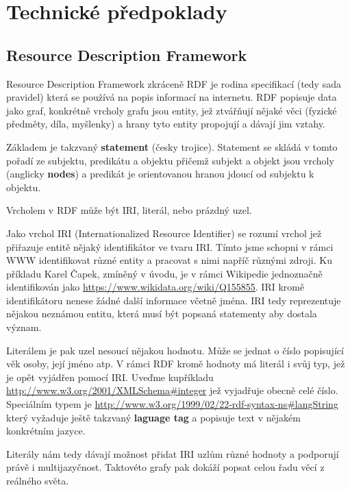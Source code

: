 \chapter{Technické předpoklady}

\section{Resource Description Framework}
Resource Description Framework zkráceně RDF je rodina specifikací (tedy sada pravidel) která se používá na popis informací na internetu. RDF popisuje data jako graf, konkrétně vrcholy grafu jsou entity, jež ztvářňují nějaké věci (fyzické předměty, díla, myšlenky) a hrany tyto entity propojují a dávají jim vztahy.

Základem je takzvaný \textbf{statement} (česky trojice). Statement se skládá v tomto pořadí ze subjektu, predikátu a objektu přičemž subjekt a objekt jsou vrcholy (anglicky \textbf{nodes}) a predikát je orientovanou hranou jdoucí od subjektu k objektu.

Vrcholem v RDF může být IRI, literál, nebo prázdný uzel.

\medskip

Jako vrchol IRI (Internationalized Resource Identifier) se rozumí vrchol jež přiřazuje entitě nějaký identifikátor ve tvaru IRI. Tímto jsme schopni v rámci WWW identifikovat různé entity a pracovat s nimi napříč různými zdroji. Ku příkladu Karel Čapek, zmíněný v úvodu, je v rámci Wikipedie jednoznačně identifikován jako \url{https://www.wikidata.org/wiki/Q155855}. IRI kromě identifikátoru nenese žádné další informace včetně jména. IRI tedy reprezentuje nějakou neznámou entitu, která musí být popsaná statementy aby dostala význam.

\medskip

Literálem je pak uzel nesoucí nějakou hodnotu. Může se jednat o číslo popisující věk osoby, její jméno atp. V rámci RDF kromě hodnoty má literál i svůj typ, jež je opět vyjádřen pomocí IRI. Uveďme kupříkladu \url{http://www.w3.org/2001/XMLSchema#integer} jež vyjadřuje obecně celé číslo. Speciálním typem je \url{http://www.w3.org/1999/02/22-rdf-syntax-ns#langString} který vyžaduje ještě takzvaný \textbf{laguage tag} a popisuje text v nějakém konkrétním jazyce.

\medskip

Literály nám tedy dávají možnost přidat IRI uzlům různé hodnoty a podporují právě i multijazyčnost. Taktovéto grafy pak dokáží popsat celou řadu věcí z reálného světa.


